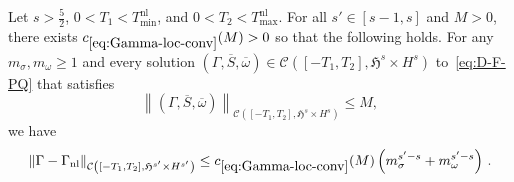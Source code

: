 \documentclass[10pt]{amsart}
\theoremstyle{definition}\newtheorem{defi}[theo]{Definition}\newtheorem{rema}[theo]{Remark}\newtheorem{exam}[theo]{Example}\newtheorem{exem}[theo]{Example}\newtheorem{nota}[theo]{Notation}
\newcommand{\nl}{\mathrm{nl}}
\newcommand{\cC}{\mathcal{C}}
\newcommand{\gH}{\mathfrak{H}}
\begin{document}
\begin{prop}\label{prop.conv-mb}
Let $s>\tfrac52$, $0<T_1<T_{\min}^{\nl}$, and $0<T_2<T_{\max}^{\nl}$. For all $s'\in[s-1,s]$ and $M>0$, there exists $c_{\eqref{eq:Gamma-loc-conv}}(M)>0$ so that the following holds. For any $m_\sigma, m_\omega\geq 1$ and every solution $(\Gamma, \overline{S}, \overline{\omega})\in\cC([-T_1,T_2],\gH^s\times H^s)$ to~\eqref{eq:D-F-PQ} that satisfies
\begin{equation*}
\left\|(\Gamma, \overline{S}, \overline{\omega})\right\|_{\cC\left([-T_1,T_2],\gH^s\times H^s\right)}\leq M,
\end{equation*}
we have
\begin{equation}\label{eq:Gamma-loc-conv}
\|\Gamma-\Gamma_{\nl}\|_{\cC\left([-T_1,T_2],\gH^{s'}\times H^{s'}\right)}\leq c_{\eqref{eq:Gamma-loc-conv}}(M)\left(m_\sigma^{s'-s}+m_{\omega}^{s'-s} \right)\,.
\end{equation}
\end{prop}
\end{document}
